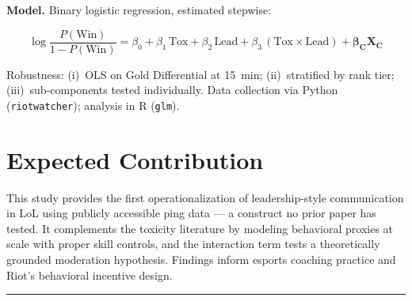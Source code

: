 \documentclass[11pt, a4paper]{article}
\begin{document}
\vspace{4pt}
\textbf{Model.} Binary logistic regression, estimated stepwise:

\vspace{-4pt}
{\small
\[
\textstyle
\log\!\frac{P(\text{Win})}{1-P(\text{Win})}
= \beta_0 + \beta_1\,\text{Tox} + \beta_2\,\text{Lead}
+ \beta_3\,(\text{Tox}\!\times\!\text{Lead})
+ \boldsymbol{\beta_C}\mathbf{X_C}
\]}

\vspace{-2pt}
Robustness: (i)~OLS on Gold Differential at 15~min; (ii)~stratified by rank tier;
(iii)~sub-components tested individually. Data collection via Python
(\texttt{riotwatcher}); analysis in R (\texttt{glm}).

\section{Expected Contribution}

This study provides the first operationalization of leadership-style communication
in LoL using publicly accessible ping data — a construct no prior paper has
tested. It complements the toxicity literature by modeling behavioral proxies at
scale with proper skill controls, and the interaction term tests a theoretically
grounded moderation hypothesis. Findings inform esports coaching practice and
Riot's behavioral incentive design.

\vspace{6pt}
\hrule
\vspace{4pt}

{\small
\printbibliography[heading=none]
}
\end{document}
